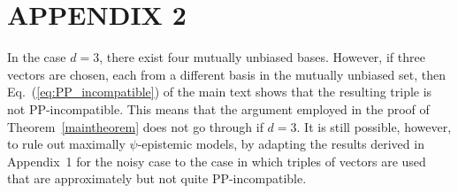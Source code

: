 \section{APPENDIX 2}\label{sec:appendix2}

In the case $d=3$, there exist four mutually unbiased bases. However, if three vectors are chosen, each from a different basis in the mutually unbiased set, then Eq.~(\ref{eq:PP_incompatible}) of the main text shows that the resulting triple is not PP-incompatible. This means that the argument employed in the proof of Theorem~\ref{maintheorem} does not go through if $d=3$. It is still possible, however, to rule out maximally $\psi$-epistemic models, by adapting the results derived in Appendix~1 for the noisy case to the case in which triples of vectors are used that are approximately but not quite PP-incompatible. 

